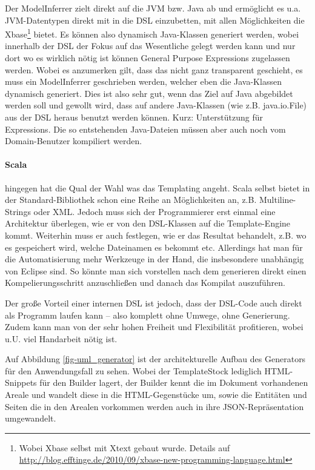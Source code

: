 Der ModelInferrer zielt direkt auf die JVM bzw. Java ab und ermöglicht es
u.a. JVM-Datentypen direkt mit in die DSL einzubetten, mit allen Möglichkeiten
die Xbase\footnote{Wobei Xbase selbst mit Xtext gebaut wurde. Details auf
\url{http://blog.efftinge.de/2010/09/xbase-new-programming-language.html}}
bietet. Es können also dynamisch Java-Klassen generiert werden, wobei innerhalb
der DSL der Fokus auf das Wesentliche gelegt werden kann und nur dort wo es
wirklich nötig ist können General Purpose Expressions zugelassen werden.
Wobei es anzumerken gilt, dass das nicht ganz transparent geschieht,
es muss ein ModelInferrer geschrieben werden, welcher eben die Java-Klassen
dynamisch generiert.
Dies ist also sehr gut, wenn das Ziel auf Java abgebildet werden soll
und gewollt wird, dass auf andere Java-Klassen (wie z.B. java.io.File)
aus der DSL heraus benutzt werden können. Kurz: Unterstützung für Expressions.
Die so entstehenden Java-Dateien müssen aber auch noch vom Domain-Benutzer
kompiliert werden.\cite{xtext}

\paragraph{Scala} hingegen hat die Qual der Wahl was das Templating angeht.
Scala selbst bietet in der Standard-Bibliothek schon
eine Reihe an Möglichkeiten an,
z.B. Multiline-Strings oder XML. Jedoch muss sich der Programmierer erst einmal
eine Architektur überlegen, wie er von den DSL-Klassen auf die Template-Engine
kommt. Weiterhin muss er auch festlegen, wie er das Resultat behandelt,
z.B. wo es gespeichert wird, welche Dateinamen es bekommt etc.
Allerdings hat man für die Automatisierung mehr Werkzeuge in der Hand,
die insbesondere unabhängig von Eclipse sind. So könnte man sich vorstellen
nach dem generieren direkt einen Kompelierungsschritt anzuschließen und
danach das Kompilat auszuführen.

Der große Vorteil einer internen DSL ist jedoch, dass der DSL-Code auch
direkt als Programm laufen kann -- also komplett ohne Umwege, ohne Generierung.
Zudem kann man von der sehr hohen Freiheit und Flexibilität profitieren,
wobei u.U. viel Handarbeit nötig ist.

Auf Abbildung \ref{fig-uml_generator} ist der architekturelle Aufbau
des Generators für den Anwendungsfall zu sehen. Wobei der TemplateStock
lediglich HTML-Snippets für den Builder lagert, der Builder
kennt die im Dokument vorhandenen Areale und wandelt diese in die HTML-Gegenstücke
um, sowie die Entitäten und Seiten die in den Arealen vorkommen werden auch
in ihre JSON-Repräsentation umgewandelt.

